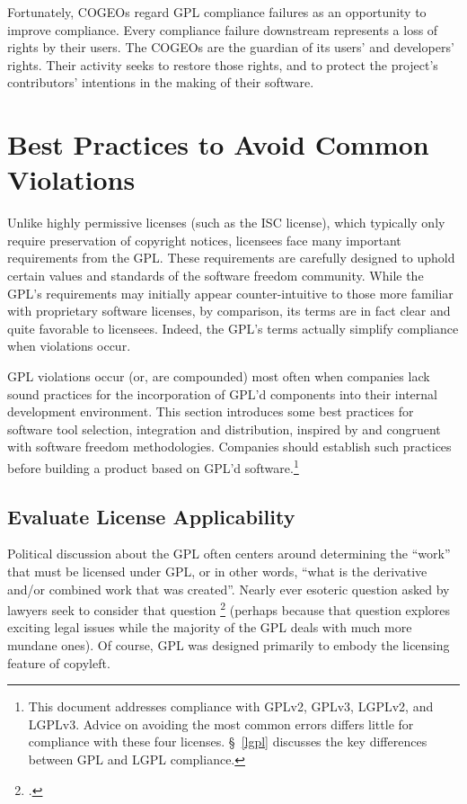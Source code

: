Fortunately, COGEOs regard GPL compliance failures as an opportunity to
improve compliance.  Every compliance failure downstream represents a loss of
rights by their users. The COGEOs are the guardian of its users' and
developers' rights.  Their activity seeks to restore those rights, and
to protect the project's contributors' intentions in the making of their
software. 

\chapter{Best Practices to Avoid Common Violations}
\label{best-practices}

Unlike highly permissive licenses (such as the ISC license), which
typically only require preservation of copyright notices, licensees face many
important requirements from the GPL.  These requirements are
carefully designed to uphold certain values and standards of the software
freedom community.  While the GPL's requirements may initially appear
counter-intuitive to those more familiar with proprietary software
licenses, by comparison, its terms are in fact clear and quite favorable to
licensees.  Indeed, the GPL's terms actually simplify compliance when
violations occur.

GPL violations occur (or, are compounded) most often when companies lack sound
practices for the incorporation of GPL'd components into their
internal development environment.  This section introduces some best
practices for software tool selection, integration and distribution,
inspired by and congruent with software freedom methodologies.  Companies should
establish such practices before building a product based on GPL'd
software.\footnote{This document addresses compliance with GPLv2,
  GPLv3, LGPLv2, and LGPLv3.  Advice on avoiding the most common
  errors differs little for compliance with these four licenses.
  \S~\ref{lgpl} discusses the key differences between GPL and LGPL
  compliance.}

\section{Evaluate License Applicability}
\label{derivative-works}
Political discussion about the GPL often centers around determining the
``work'' that must be licensed under GPL, or in other words, ``what is the
derivative and/or combined work that was created''.  Nearly ever esoteric
question asked by lawyers seek to consider that question
\footnote{.} (perhaps because
that question explores exciting legal issues while the majority of the GPL
deals with much more mundane ones).
Of course, GPL was designed
primarily to embody the licensing feature of copyleft.

